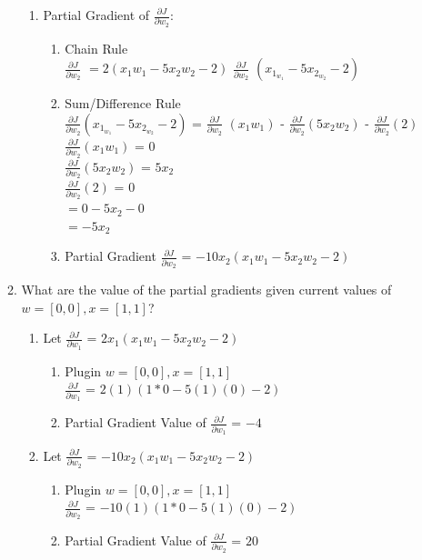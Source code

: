 \documentclass[12pt]{article}
\begin{document}
\begin{enumerate}
\begin{enumerate}
        \begin{enumerate}
            \item Partial Gradient of $\frac{\partial J}{\partial w_2}$:
            \begin{enumerate}
            \item Chain Rule\\
            $\frac{\partial J}{\partial w_2}$ $=2(x_1w_1 - 5x_2w_2-2)$ $\frac{\partial J}{\partial w_2}$ $(x_1_w_1 - 5x_2_w_2 -2)$ 
            \item Sum/Difference Rule\\
            $\frac{\partial J}{\partial w_2}$$(x_1_w_1 - 5x_2_w_2 -2)$ = $\frac{\partial J}{\partial w_2}$ $(x_1w_1)$ - $\frac{\partial J}{\partial w_2}$$(5x_2w_2)$ - $\frac{\partial J}{\partial w_2}$$(2)$ \\
            $\frac{\partial J}{\partial w_2}$$(x_1w_1)$ = $0$ \\
            $\frac{\partial J}{\partial w_2}$$(5x_2w_2)$ = $5x_2$ \\
            $\frac{\partial J}{\partial w_2}$$(2)$ = $0$ \\
            $= 0 - 5x_2 - 0$ \\
            $= -5x_2$
            \item Partial Gradient
            $\frac{\partial J}{\partial w_2}$ = $-10x_2(x_1w_1 - 5x_2w_2 -2)$
            \end{enumerate}
        \end{enumerate}
    \item What are the value of the partial gradients given current values of $w=[0, 0], x=[1, 1]$?
        \begin{enumerate}
            \item Let $\frac{\partial J}{\partial w_1}$ = $2x_1(x_1w_1 - 5x_2w_2 -2)$
            \begin{enumerate}
            \item Plugin $w=[0, 0], x=[1, 1]$\\
            $\frac{\partial J}{\partial w_1}$ = $2(1)(1 * 0 - 5(1)(0) -2)$
            \item Partial Gradient Value of $\frac{\partial J}{\partial w_1}$ = $-4$
            \end{enumerate}
            
            \item Let $\frac{\partial J}{\partial w_2}$ = $-10x_2(x_1w_1 - 5x_2w_2 -2)$
            \begin{enumerate}
            \item Plugin $w=[0, 0], x=[1, 1]$\\
            $\frac{\partial J}{\partial w_2}$ = $-10(1)(1 * 0 - 5(1)(0) -2)$
            \item Partial Gradient Value of $\frac{\partial J}{\partial w_2}$ = $20$
            \end{enumerate}
        \end{enumerate}
    \end{enumerate}
\end{enumerate}
\newpage
\end{document}
